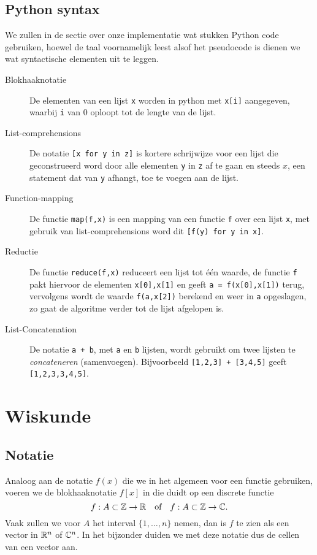 \subsection{Python syntax}
\label{python}
We zullen in de sectie over onze implementatie wat stukken Python code gebruiken, hoewel de taal
voornamelijk leest alsof het pseudocode is dienen we wat syntactische elementen uit te leggen.
\begin{description}
\item[Blokhaaknotatie] De elementen van een lijst \texttt{x} worden in python met \texttt{x[i]} aangegeven,
  waarbij \texttt{i} van $0$ oploopt tot de lengte van de lijst.
\item[List-comprehensions] De notatie \texttt{[x for y in z]} is kortere schrijwijze voor een lijst die geconstrueerd
  word door alle elementen \texttt{y} in \texttt{z} af te gaan en steeds 
  $x$, een statement dat van \texttt{y} afhangt, toe te voegen aan de lijst.
\item[Function-mapping] De functie \texttt{map(f,x)} is een mapping van een functie \texttt{f} over een lijst 
  \texttt{x}, met gebruik van list-comprehensions word dit \texttt{[f(y) for y in x]}.
\item[Reductie] De functie \texttt{reduce(f,x)} reduceert een lijst tot \'e\'en waarde, de functie \texttt{f} pakt
  hiervoor de elementen \texttt{x[0],x[1]} en geeft \texttt{a = f(x[0],x[1])} terug, vervolgens wordt
  de waarde \texttt{f(a,x[2])} berekend en weer in \texttt{a} opgeslagen, zo gaat de algoritme verder tot de lijst
  afgelopen is.
\item[List-Concatenation] De notatie \texttt{a + b}, met \texttt{a} en \texttt{b} lijsten, wordt gebruikt om twee lijsten te \emph{concateneren} (samenvoegen). Bijvoorbeeld \texttt{[1,2,3] + [3,4,5]} geeft \texttt{[1,2,3,3,4,5]}.

\end{description}
\section{Wiskunde}

\subsection{Notatie}
Analoog aan de notatie $f(x)$ die we in het algemeen voor een functie gebruiken, voeren we de blokhaaknotatie $f[x]$ in die duidt op een discrete functie
\[
f:A\subset \mathbb{Z}\to \mathbb{R} \text{\quad of\quad} f:A\subset \mathbb{Z}\to \mathbb{C}.  
\]
Vaak zullen we voor $A$ het interval $\{1,\ldots,n\}$ nemen, 
dan is $f$ te zien als een vector in $\mathbb{R}^n$ of $\mathbb{C}^n$.
In het bijzonder duiden we met deze notatie dus de cellen van een vector aan.

